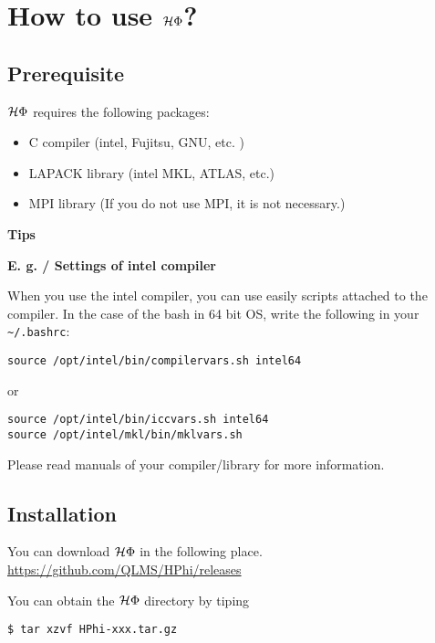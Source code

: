 \chapter{How to use $\mathcal{H} \Phi$?}
\label{Ch:HowTo}

\section{Prerequisite}

$\mathcal{H} \Phi$ requires the following packages:
\begin{itemize}
\item C compiler (intel, Fujitsu, GNU, etc. )
\item LAPACK library (intel MKL, ATLAS, etc.)
\item MPI library (If you do not use MPI, it is not necessary.)
\end{itemize}

\begin{screen}
\Large 
{\bf Tips}
\normalsize

{\bf E. g. / Settings of intel compiler}

When you use the intel compiler, you can use easily scripts attached to the compiler.
In the case of the bash in 64 bit OS, write the following in your \verb|~/.bashrc|:
\begin{verbatim}
source /opt/intel/bin/compilervars.sh intel64
\end{verbatim}
or
\begin{verbatim}
source /opt/intel/bin/iccvars.sh intel64
source /opt/intel/mkl/bin/mklvars.sh
\end{verbatim}

Please read manuals of your compiler/library for more information.

\end{screen}

\section{Installation}

You can download $\mathcal{H} \Phi$ in the following place.\\
\url{https://github.com/QLMS/HPhi/releases}

You can obtain the $\mathcal{H} \Phi$ directory by tiping
\begin{verbatim}
$ tar xzvf HPhi-xxx.tar.gz
\end{verbatim}

